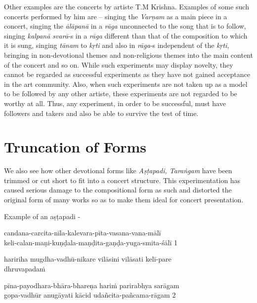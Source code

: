 Other examples are the concerts by artiste T.M Krishna. Examples of some such concerts performed by him are – singing the \textit{Varṇam} as a main piece in a concert, singing the \textit{ālāpanā} in a \textit{rāga} unconnected to the song that is to follow, singing \textit{kalpanā svarā}-s in a \textit{rāga} different than that of the composition to which it is sung, singing \textit{tānam} to \textit{kṛti} and also in \textit{rāga}-s independent of the \textit{kṛti}, bringing in non-devotional themes and non-religious themes into the main content of the concert and so on. While such experiments may display novelty, they cannot be regarded as successful experiments as they have not gained acceptance in the art community. Also, when such experiments are not taken up as a model to be followed by any other artiste, these experiments are not regarded to be worthy at all. Thus, any experiment, in order to be successful, must have followers and takers and also be able to survive the test of time.


\section*{Truncation of Forms}

We also see how other devotional forms like \textit{Aṣṭapadi, Taraṅgam} have been trimmed or cut short to fit into a concert structure. This experimentation has caused serious damage to the compositional form as such and distorted the original form of many works so as to make them ideal for concert presentation.

Example of an aṣṭapadi -

\begin{myquote}
candana-carcita-nīla-kalevara-pīta-vasana-vana-mālī \\ keli-calan-maṇi-kuṇḍala-maṇḍita-gaṇḍa-yuga-smita-śālī 1 
\end{myquote}

\begin{myquote}
haririha mugdha-vadhū-nikare vilāsini vilāsati kelī-pare \\ dhruvapadaṁ 
\end{myquote}

\begin{myquote}
pīna-payodhara-bhāra-bhareṇa hariṁ parirabhya sarāgam \\ gopa-vadhūr anugāyati kācid udañcita-pañcama-rāgam  2 
\end{myquote}

